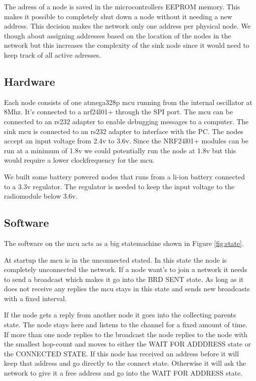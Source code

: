 \documentclass[a4paper,11pt]{article}
\begin{document}
The adress of a node is saved in the microcontrollers EEPROM memory.
This makes it possible to completely shut down a node without it 
needing a new address. This decision makes the network only one 
address per physical node. We though about assigning addresses based
on the location of the nodes in the network but this increases 
the complexity of the sink node since it would need to keep track of
all active adresses.

\subsection{Hardware}
Each node consists of one atmega328p mcu running from the
internal oscillator at 8Mhz. It's connected to a nrf24l01+ through the
SPI port. The mcu can be connected to an rs232 adapter to enable
debugging messages to a computer. The sink mcu is connected to an
rs232 adapter to interface with the PC. The nodes accept an input
voltage from 2.4v to 3.6v. Since the NRF24l01+ modules can be run at a
minimum of 1.8v we could potentially run the node at 1.8v but this
would require a lower clockfrequency for the mcu. 

We built some battery powered nodes that runs from a li-ion battery
connected to a 3.3v regulator. The regulator is needed to keep the 
input voltage to the radiomodule below 3.6v.



\subsection{Software}
The software on the mcu acts as a big statemachine shown in Figure \ref{fig:state}.

At startup the mcu is in the unconnected stated. In this state the
node is completely unconnected the network. If a node want's to join a
network it needs to send a broadcast which makes it go into the BRD
SENT state. As long as it does not receive any replies the mcu stays
in this state and sends new broadcasts with a fixed interval.

If the node gets a reply from another node it goes into the collecting
parents state. The node stays here and listens to the channel for a
fixed amount of time. If more than one node replies to the broadcast
the node replies to the node with the smallest hop-count and moves to
either the WAIT FOR ADDDRESS state or the CONNECTED STATE. If this
node has received an address before it will keep that address and go
directly to the connect state. Otherwise it will ask the network to
give it a free address and go into the WAIT FOR ADDRESS state.
\end{document}
